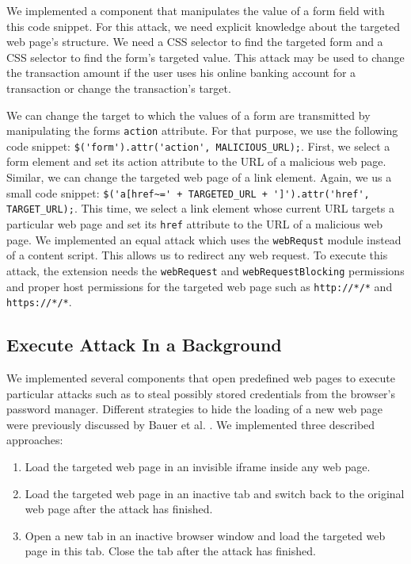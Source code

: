 	We implemented a component that manipulates the value of a form field with this code snippet. For this attack, we need explicit knowledge about the targeted web page's structure. We need a CSS selector to find the targeted form and a CSS selector to find the form's targeted value. This attack may be used to change the transaction amount if the user uses his online banking account for a transaction or change the transaction's target. 

	We can change the target to which the values of a form are transmitted by manipulating the forms \texttt{action} attribute. For that purpose, we use the following code snippet: \lstinline|$('form').attr('action', MALICIOUS_URL);|. First, we select a form element and set its action attribute to the URL of a malicious web page. Similar, we can change the targeted web page of a link element. Again, we us a small code snippet: \lstinline|$('a[href~=' + TARGETED_URL + ']').attr('href', TARGET_URL);|. This time, we select a link element whose current URL targets a particular web page and set its \texttt{href} attribute to the URL of a malicious web page. We implemented an equal attack which uses the \texttt{webRequst} module instead of a content script. This allows us to redirect any web request. To execute this attack, the extension needs the \texttt{webRequest} and \texttt{webRequestBlocking} permissions and proper host permissions for the targeted web page such as \texttt{http://*/*} and \texttt{https://*/*}. 
	
\subsection{Execute Attack In a Background}
\label{sec:executeAttackInBackground}

	We implemented several components that open predefined web pages to execute particular attacks such as to steal possibly stored credentials from the browser's password manager. Different strategies to hide the loading of a new web page were previously discussed by Bauer et al. \cite{extensions:cns14}. We implemented three described approaches:
	
	\begin{enumerate}
		\item Load the targeted web page in an invisible iframe inside any web page.
		\item Load the targeted web page in an inactive tab and switch back to the original web page after the attack has finished.
		\item Open a new tab in an inactive browser window and load the targeted web page in this tab. Close the tab after the attack has finished.
	\end{enumerate} 
	
